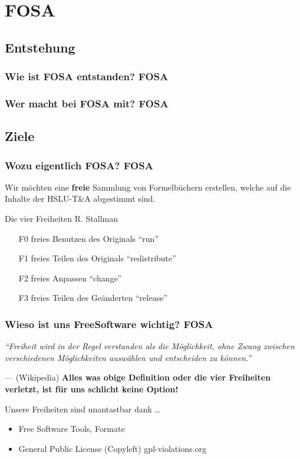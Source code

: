 \section{FOSA}

\subsection{Entstehung}
\begin{frame}
	\frametitle{Wie ist FOSA entstanden? \hfill{} \footnotesize{FOSA}}
\end{frame}

\begin{frame}
	\frametitle{Wer macht bei FOSA mit? \hfill{} \footnotesize{FOSA}}
\end{frame}

\subsection{Ziele}
\begin{frame}
	\frametitle{Wozu eigentlich FOSA? \hfill{} \footnotesize{FOSA}}
	Wir möchten eine \textbf{freie} Sammlung von 
	Formelbüchern erstellen, welche auf die Inhalte der HSLU-T\&A
	abgestimmt sind.
	\vfill{}
	\begin{exampleblock}{Die vier Freiheiten 
		\hfill{} 
		\footnotesize{R. Stallman}}
		\begin{itemize}
			\item[F0] freies Benutzen des Originals 
				\hfill{} \footnotesize{"`run"'}
				\normalsize
			\item[F1] freies Teilen des Originals
				\hfill{} \footnotesize{"`redistribute"'}
				\normalsize
			\item[F2] freies Anpassen 
				\hfill{} \footnotesize{"`change"'}
				\normalsize
			\item[F3] freies Teilen des Geänderten 
				\hfill{} \footnotesize{"`release"'}
				\normalsize
		\end{itemize}
	\end{exampleblock}
\end{frame}

\begin{frame}
	\frametitle{Wieso ist uns FreeSoftware wichtig? 
		\hfill{} 
		\footnotesize{FOSA}}
	\textit{"`Freiheit wird in der Regel verstanden als die 
	Möglichkeit, ohne Zwang zwischen verschiedenen Möglichkeiten 
	auswählen und entscheiden zu können."'} 
	
	\hfill{} --- (Wikipedia)
	\vfill{}
	\textbf{Alles was obige Definition oder die vier Freiheiten
	verletzt, ist für uns schlicht keine Option!}
	\vfill{}
	\begin{exampleblock}{Unsere Freiheiten sind unantastbar dank \dots}
		\begin{itemize}
			\item Free Software 
				\hfill{} 
				\footnotesize{Tools, Formate}
				\normalsize
			\item General Public License (Copyleft) 
				\hfill{}
				\footnotesize{gpl-violations.org}
				\normalsize
		\end{itemize}
	\end{exampleblock}
\end{frame}
